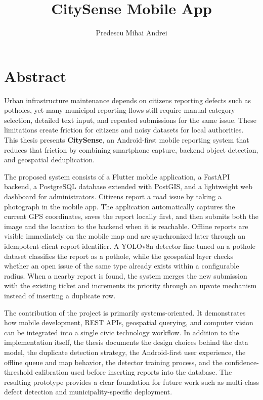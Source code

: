 \documentclass[12pt]{report}
\begin{document}
\title{CitySense Mobile App}
\author{Predescu Mihai Andrei}

\maketitle

\newpage
{}

\chapter*{Abstract}

Urban infrastructure maintenance depends on citizens reporting defects such as potholes, yet many municipal reporting flows still require manual category selection, detailed text input, and repeated submissions for the same issue. These limitations create friction for citizens and noisy datasets for local authorities. This thesis presents \textbf{CitySense}, an Android-first mobile reporting system that reduces that friction by combining smartphone capture, backend object detection, and geospatial deduplication.

The proposed system consists of a Flutter mobile application, a FastAPI backend, a PostgreSQL database extended with PostGIS, and a lightweight web dashboard for administrators. Citizens report a road issue by taking a photograph in the mobile app. The application automatically captures the current GPS coordinates, saves the report locally first, and then submits both the image and the location to the backend when it is reachable. Offline reports are visible immediately on the mobile map and are synchronized later through an idempotent client report identifier. A YOLOv8n detector fine-tuned on a pothole dataset classifies the report as a pothole, while the geospatial layer checks whether an open issue of the same type already exists within a configurable radius. When a nearby report is found, the system merges the new submission with the existing ticket and increments its priority through an upvote mechanism instead of inserting a duplicate row.

The contribution of the project is primarily systems-oriented. It demonstrates how mobile development, REST APIs, geospatial querying, and computer vision can be integrated into a single civic technology workflow. In addition to the implementation itself, the thesis documents the design choices behind the data model, the duplicate detection strategy, the Android-first user experience, the offline queue and map behavior, the detector training process, and the confidence-threshold calibration used before inserting reports into the database. The resulting prototype provides a clear foundation for future work such as multi-class defect detection and municipality-specific deployment.
\end{document}

